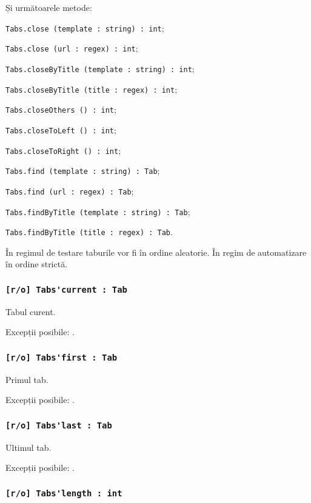 Și următoarele metode:
\begin{icItems}
	\item \lstinline|Tabs.close (template : string) : int|;
	\item \lstinline|Tabs.close (url : regex) : int|;
	\item \lstinline|Tabs.closeByTitle (template : string) : int|;
	\item \lstinline|Tabs.closeByTitle (title : regex) : int|;
	\item \lstinline|Tabs.closeOthers () : int|;
	\item \lstinline|Tabs.closeToLeft () : int|;
	\item \lstinline|Tabs.closeToRight () : int|;
	\item \lstinline|Tabs.find (template : string) : Tab|;
	\item \lstinline|Tabs.find (url : regex) : Tab|;
	\item \lstinline|Tabs.findByTitle (template : string) : Tab|;
	\item \lstinline|Tabs.findByTitle (title : regex) : Tab|.
\end{icItems}

În regimul de testare taburile vor fi în ordine aleatorie. În regim de automatizare în ordine strictă.

\subsubsection{\lstinline|[r/o] Tabs'current : Tab|}

Tabul curent.

Excepții posibile: .

\subsubsection{\lstinline|[r/o] Tabs'first : Tab|}

Primul tab.

Excepții posibile: .

\subsubsection{\lstinline|[r/o] Tabs'last : Tab|}

Ultimul tab.

Excepții posibile: .

\subsubsection{\lstinline|[r/o] Tabs'length : int|}

